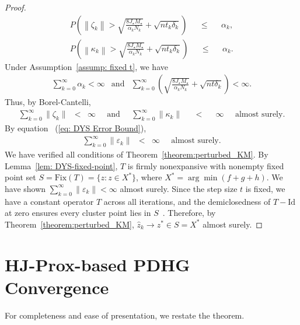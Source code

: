\documentclass{article}
\newcommand{\amp}{\mathop{\:\:\,}\nolimits}
\theoremstyle{plain}
\theoremstyle{definition}
\theoremstyle{remark}
\begin{document}
\begin{proof}
\begin{eqnarray}
    P\left(\left\|\zeta_k\right\| > \sqrt{\frac{8J_\star M_\star}{\alpha_k N_k}} +\sqrt{nt_k\delta_k}\right) \amp \leq \amp \alpha_k,\\
    P\left(\left\|\kappa_k\right\| > \sqrt{\frac{8J_\star M_\star}{\alpha_k N_k}} +\sqrt{nt_k\delta_k}\right) \amp \leq \amp \alpha_k.
\end{eqnarray}
Under Assumption~\ref{assump: fixed t}, we have
\begin{eqnarray}
    \sum_{k=0}^\infty \alpha_k < \infty &\text{and}& \sum_{k=0}^\infty \left(\sqrt{\frac{8J_\star M_\star}{\alpha_k N_k}}+\sqrt{nt\delta_k}\right)< \infty.
\end{eqnarray}
Thus, by Borel-Cantelli, 
\begin{eqnarray}
\sum_{k=0}^\infty \|\zeta_k\| &<& \infty  \amp\text{and}\amp   \sum_{k=0}^\infty \|\kappa_k\| \amp < \amp \infty  \amp \text{almost surely}.
\end{eqnarray}
By equation ~(\ref{eq: DYS Error Bound}),
\begin{eqnarray}
    \sum_{k=0}^\infty \|\varepsilon_k\| &<& \infty \amp \text{almost surely}.
\end{eqnarray}
We have verified all conditions of Theorem~\ref{theorem:perturbed_KM}. By Lemma~\ref{lem: DYS-fixed-point}, $T$ is firmly nonexpansive with nonempty fixed point set $S = \mathrm{Fix}(T) = \{z : z \in X^*\}$, where $X^* = \arg\min(f+g+h)$. We have shown $\sum_{k=0}^\infty \|\varepsilon_k\| < \infty$ almost surely. Since the step size $t$ is fixed, we have a constant operator $T$ across all iterations, and the demiclosedness of $T - \mathrm{Id}$ at zero ensures every cluster point lies in $S$~\cite{Combettes2001}. Therefore, by Theorem~\ref{theorem:perturbed_KM}, $\hat{z}_k \to z^* \in S = X^*$ almost surely.
\end{proof} 

\section{HJ-Prox-based PDHG Convergence}
For completeness and ease of presentation, we restate the theorem.
\end{document}
